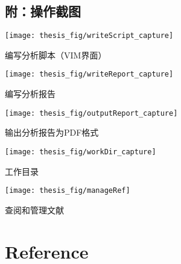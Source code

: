 \documentclass[
]{article}
\begin{document}
\hypertarget{ux9644ux64cdux4f5cux622aux56fe}{%
\subsection{附：操作截图}\label{ux9644ux64cdux4f5cux622aux56fe}}

\bgroup {}
\texttt{[image: thesis\_fig/writeScript\_capture]} \caption{编写分析脚本（VIM界面）}\label{fig:fig12}
\makeatletter \egroup

\bgroup {}
\texttt{[image: thesis\_fig/writeReport\_capture]} \caption{编写分析报告}\label{fig:fig13}
\makeatletter \egroup

\bgroup {}
\texttt{[image: thesis\_fig/outputReport\_capture]} \caption{输出分析报告为PDF格式}\label{fig:fig14}
\makeatletter \egroup

\bgroup {}
\texttt{[image: thesis\_fig/workDir\_capture]} \caption{工作目录}\label{fig:fig15}
\makeatletter \egroup

\bgroup {}
\texttt{[image: thesis\_fig/manageRef]} \caption{查阅和管理文献}\label{fig:fig16}
\makeatletter \egroup

\hypertarget{bibliography}{%
\section*{Reference}\label{bibliography}}
\end{document}
